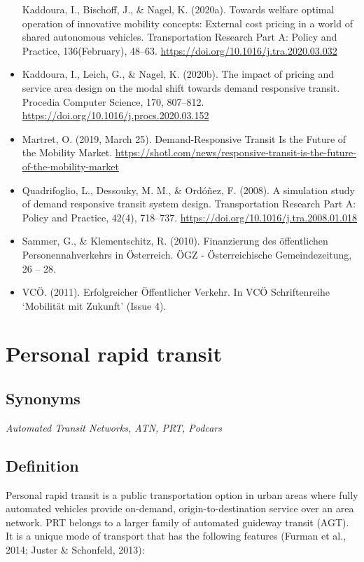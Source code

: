 \documentclass[
]{book}
\begin{document}
\begin{itemize}
  Kaddoura, I., Bischoff, J., \& Nagel, K. (2020a). Towards welfare optimal operation of innovative mobility concepts: External cost pricing in a world of shared autonomous vehicles. Transportation Research Part A: Policy and Practice, 136(February), 48--63. \url{https://doi.org/10.1016/j.tra.2020.03.032}
\item
  Kaddoura, I., Leich, G., \& Nagel, K. (2020b). The impact of pricing and service area design on the modal shift towards demand responsive transit. Procedia Computer Science, 170, 807--812. \url{https://doi.org/10.1016/j.procs.2020.03.152}
\item
  Martret, O. (2019, March 25). Demand-Responsive Transit Is the Future of the Mobility Market. \url{https://shotl.com/news/responsive-transit-is-the-future-of-the-mobility-market}
\item
  Quadrifoglio, L., Dessouky, M. M., \& Ordóñez, F. (2008). A simulation study of demand responsive transit system design. Transportation Research Part A: Policy and Practice, 42(4), 718--737. \url{https://doi.org/10.1016/j.tra.2008.01.018}
\item
  Sammer, G., \& Klementschitz, R. (2010). Finanzierung des öffentlichen Personennahverkehrs in Österreich. ÖGZ - Österreichische Gemeindezeitung, 26 -- 28.
\item
  VCÖ. (2011). Erfolgreicher Öffentlicher Verkehr. In VCÖ Schriftenreihe `Mobilität mit Zukunft' (Issue 4).
\end{itemize}

\hypertarget{prt}{%
\section{Personal rapid transit}\label{prt}}

\hypertarget{synonyms-34}{%
\subsection*{Synonyms}\label{synonyms-34}}

\emph{Automated Transit Networks, ATN, PRT, Podcars}

\hypertarget{definition-37}{%
\subsection*{Definition}\label{definition-37}}

Personal rapid transit is a public transportation option in urban areas where fully automated vehicles provide on-demand, origin-to-destination service over an area network. PRT belongs to a larger family of automated guideway transit (AGT). It is a unique mode of transport that has the following features (Furman et al., 2014; Juster \& Schonfeld, 2013):
\end{document}
